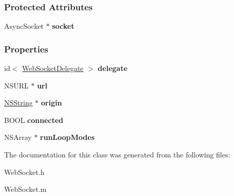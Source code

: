 \subsubsection*{Protected Attributes}
\begin{DoxyCompactItemize}
\item 
\hypertarget{interface_web_socket_a4cec38738f0662d4457e4bf029b6773a}{
AsyncSocket $\ast$ {\bfseries socket}}
\label{interface_web_socket_a4cec38738f0662d4457e4bf029b6773a}

\end{DoxyCompactItemize}
\subsubsection*{Properties}
\begin{DoxyCompactItemize}
\item 
\hypertarget{interface_web_socket_a2d1c0bfc2586a7ced6e93ad280cc300a}{
id$<$ \hyperlink{protocol_web_socket_delegate-p}{WebSocketDelegate} $>$ {\bfseries delegate}}
\label{interface_web_socket_a2d1c0bfc2586a7ced6e93ad280cc300a}

\item 
\hypertarget{interface_web_socket_a636e7caa02b814a815069bf86e9904cf}{
NSURL $\ast$ {\bfseries url}}
\label{interface_web_socket_a636e7caa02b814a815069bf86e9904cf}

\item 
\hypertarget{interface_web_socket_a63ee74d8fb2c6885445bc60c541bb026}{
\hyperlink{class_n_s_string}{NSString} $\ast$ {\bfseries origin}}
\label{interface_web_socket_a63ee74d8fb2c6885445bc60c541bb026}

\item 
\hypertarget{interface_web_socket_ad06af768bbc607e567590952543ffb4a}{
BOOL {\bfseries connected}}
\label{interface_web_socket_ad06af768bbc607e567590952543ffb4a}

\item 
\hypertarget{interface_web_socket_aacdc18bbe91d9f49658ed1bfbd9fa7c0}{
NSArray $\ast$ {\bfseries runLoopModes}}
\label{interface_web_socket_aacdc18bbe91d9f49658ed1bfbd9fa7c0}

\end{DoxyCompactItemize}


The documentation for this class was generated from the following files:\begin{DoxyCompactItemize}
\item 
WebSocket.h\item 
WebSocket.m\end{DoxyCompactItemize}
